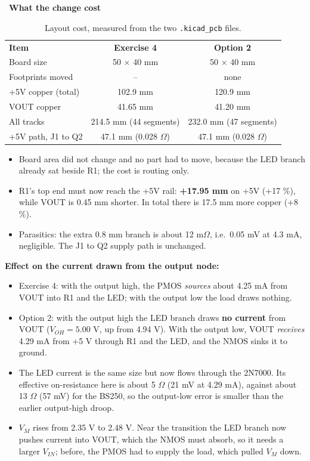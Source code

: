 \documentclass[11pt,a4paper]{article}
\newcommand{\lab}[2]{\Needspace{5\baselineskip}\vspace{6pt}{\sffamily\bfseries\color{teal}\large #1}\ {\sffamily\bfseries\color{ink}#2}\par\vspace{-2pt}{\color{amber}\rule{2.2em}{1.4pt}}\par\vspace{2pt}}
\begin{document}
\lab{2.3}{What the change cost}
\begin{table}[H]\centering\small\sffamily
\begin{tabular}{@{}lcc@{}}\rowcolor{teal}\color{white}\textbf{Item}&\color{white}\textbf{Exercise 4}&\color{white}\textbf{Option 2}\\
Board size&50 $\times$ 40 mm&50 $\times$ 40 mm\\
\rowcolor{mist}Footprints moved&--&none\\
+5V copper (total)&102.9 mm&120.9 mm\\
\rowcolor{mist}VOUT copper&41.65 mm&41.20 mm\\
All tracks&214.5 mm (44 segments)&232.0 mm (47 segments)\\
\rowcolor{mist}+5V path, J1 to Q2&47.1 mm (0.028 $\Omega$)&47.1 mm (0.028 $\Omega$)\\\end{tabular}
\caption{Layout cost, measured from the two \texttt{.kicad\_pcb} files.}\end{table}
\begin{itemize}
\item Board area did not change and no part had to move, because the LED branch already sat beside R1; the cost is routing only.
\item R1's top end must now reach the +5V rail: \textbf{+17.95 mm} on +5V (+17 \%), while VOUT is 0.45 mm shorter. In total there is 17.5 mm more copper (+8 \%).
\item Parasitics: the extra 0.8 mm branch is about 12 m$\Omega$, i.e.\ 0.05 mV at 4.3 mA, negligible. The J1 to Q2 supply path is unchanged.
\end{itemize}
\begin{answer}
\textbf{Effect on the current drawn from the output node:}
\begin{itemize}
\item Exercise 4: with the output high, the PMOS \emph{sources} about 4.25 mA from VOUT into R1 and the LED; with the output low the load draws nothing.
\item Option 2: with the output high the LED branch draws \textbf{no current} from VOUT ($V_{OH}=5.00$ V, up from 4.94 V). With the output low, VOUT \emph{receives} 4.29 mA from +5 V through R1 and the LED, and the NMOS sinks it to ground.
\item The LED current is the same size but now flows through the 2N7000. Its effective on-resistance here is about 5 $\Omega$ (21 mV at 4.29 mA), against about 13 $\Omega$ (57 mV) for the BS250, so the output-low error is smaller than the earlier output-high droop.
\item $V_M$ rises from 2.35 V to 2.48 V. Near the transition the LED branch now pushes current into VOUT, which the NMOS must absorb, so it needs a larger $V_{IN}$; before, the PMOS had to supply the load, which pulled $V_M$ down.
\end{itemize}
\end{answer}
\end{document}
